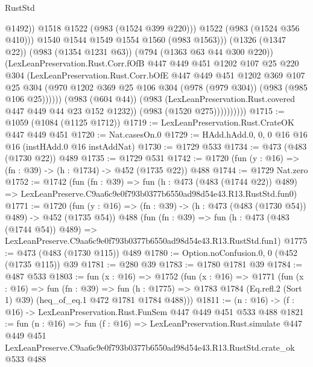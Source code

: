 \begin{lexlean}{RustStd}
\begin{coremodule}
                                  @1492))
                              @1518
                              @1522
                              (@983 (@1524 @399 @220)))
                            @1522
                            (@983 (@1524 @356 @410)))
                          @1540
                          @1544
                          @1549
                          @1554
                          @1560
                          (@983 @1563)))
                      (@1326 (@1347 @22))
                      (@983 (@1354 @1231 @63))
                      (@794 (@1363 @63 @44 @300 @220))
                      (LexLeanPreservation.Rust.Corr.fOfB
                        @447
                        @449
                        @451
                        @1202
                        @107
                        @25
                        @220
                        @304
                        (LexLeanPreservation.Rust.Corr.bOfE
                          @447
                          @449
                          @451
                          @1202
                          @369
                          @107
                          @25
                          @304
                          (@970
                            @1202
                            @369
                            @25
                            @106
                            @304
                            (@978 (@979 @304))
                            (@983 (@985 @106 @25))))))
                    (@983 (@604 @44))
                    (@983 (LexLeanPreservation.Rust.covered @447 @449 @44 @23 @152 @1232))
                    (@983 (@1520 @275))))))))))
@1715 := @1059 (@1084 (@1125 @1712))
@1719 := LexLeanPreservation.Rust.CrateOK @447 @449 @451
@1720 := Nat.casesOn.{0}
@1729 := HAdd.hAdd.{0, 0, 0} @16 @16 @16 (instHAdd.{0} @16 instAddNat)
@1730 := @1729 @533
@1734 := @473 (@483 (@1730 @22)) @489
@1735 := @1729 @531
@1742 := @1720 (fun (y : @16) => (fn : @39) -> (h : @1734) -> @452 (@1735 @22)) @488
@1744 := @1729 Nat.zero
@1752 := @1742
    (fun (fn : @39) =>
    fun (h : @473 (@483 (@1744 @22)) @489) =>
    LexLeanPreserve.C9aa6c9e0f793b0377b6550ad98d54e43.R13.RustStd.fun0)
@1771 := @1720
    (fun (y : @16) => (fn : @39) -> (h : @473 (@483 (@1730 @54)) @489) -> @452 (@1735 @54))
    @488
    (fun (fn : @39) =>
    fun (h : @473 (@483 (@1744 @54)) @489) =>
    LexLeanPreserve.C9aa6c9e0f793b0377b6550ad98d54e43.R13.RustStd.fun1)
@1775 := @473 (@483 (@1730 @115)) @489
@1780 := Option.noConfusion.{0, 0} (@452 (@1735 @115)) @39
@1781 := @280 @39
@1783 := @1780 @1781 @39
@1784 := @487 @533
@1803 := fun (x : @16) =>
  @1752
    (fun (x : @16) =>
    @1771
      (fun (x : @16) =>
      fun (fn : @39) =>
      fun (h : @1775) =>
      @1783 @1784 (Eq.refl.{2} (Sort 1) @39) (heq_of_eq.{1} @472 @1781 @1784 @488)))
@1811 := (n : @16) -> (f : @16) -> LexLeanPreservation.Rust.FunSem @447 @449 @451 @533 @488
@1821 := fun (n : @16) =>
  fun (f : @16) =>
  LexLeanPreservation.Rust.simulate
    @447
    @449
    @451
    LexLeanPreserve.C9aa6c9e0f793b0377b6550ad98d54e43.R13.RustStd.crate_ok
    @533
    @488
\end{coremodule}
\end{lexlean}
